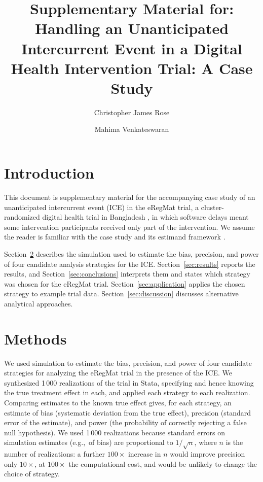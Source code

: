 
\author{Christopher James Rose \and Mahima Venkateswaran}
\title{Supplementary Material for:\\ Handling an Unanticipated Intercurrent
Event in a Digital Health Intervention Trial: A Case Study}
\date{}
\maketitle

\section{Introduction}

This document is supplementary material for the accompanying case study of
an unanticipated intercurrent event (ICE) in the eRegMat trial, a
cluster-randomized digital health trial in Bangladesh \citep{rahman2021,
venkateswaran2024}, in which software delays meant some intervention
participants received only part of the intervention. We assume the reader
is familiar with the case study and its estimand framework \citep{iche9r1}.

Section~\ref{sec:methods} describes the simulation used to estimate the
bias, precision, and power of four candidate analysis strategies for the
ICE. Section~\ref{sec:results} reports the results, and
Section~\ref{sec:conclusions} interprets them and states which strategy
was chosen for the eRegMat trial. Section~\ref{sec:application} applies
the chosen strategy to example trial data. Section~\ref{sec:discussion}
discusses alternative analytical approaches.


\section{Methods}\label{sec:methods}

We used simulation to estimate the bias, precision, and power of four
candidate strategies for analyzing the eRegMat trial in the presence of
the ICE. We synthesized 1\,000 realizations of the trial in Stata,
specifying and hence knowing the true treatment effect in each, and
applied each strategy to each realization. Comparing estimates to the
known true effect gives, for each strategy, an estimate of bias
(systematic deviation from the true effect), precision (standard error of
the estimate), and power (the probability of correctly rejecting a false
null hypothesis). We used 1\,000 realizations because standard errors on
simulation estimates (e.g.,~of bias) are proportional to $1/\sqrt{n}$,
where $n$ is the number of realizations: a further $100\times$ increase in
$n$ would improve precision only $10\times$, at $100\times$ the
computational cost, and would be unlikely to change the choice of
strategy.

